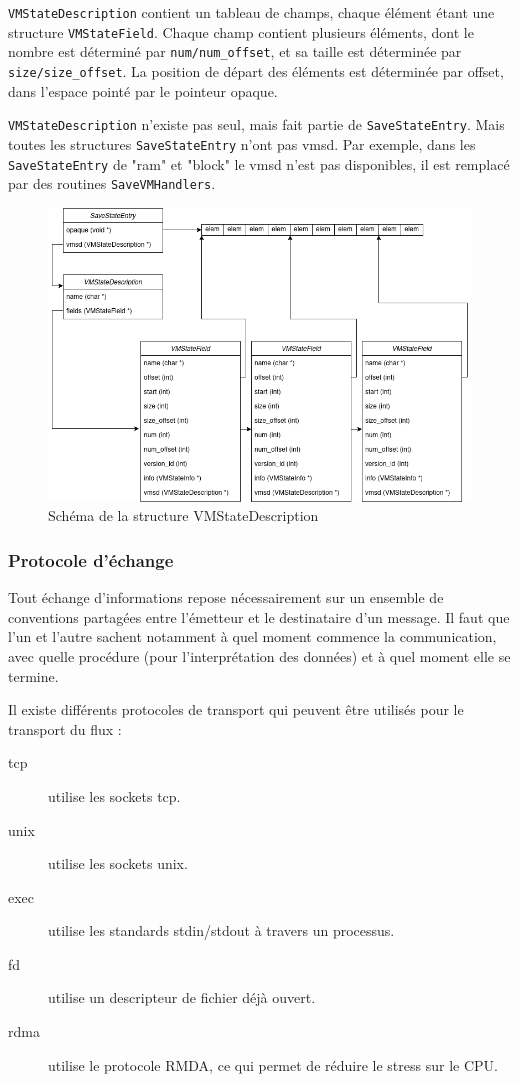 \texttt{VMStateDescription} contient un tableau de champs, chaque élément étant une structure \texttt{VMStateField}.
Chaque champ contient plusieurs éléments, dont le nombre est déterminé par \texttt{num/num\_offset}, et sa taille est déterminée par \texttt{size/size\_offset}.
La position de départ des éléments est déterminée par offset, dans l'espace pointé par le pointeur opaque.

\texttt{VMStateDescription} n'existe pas seul, mais fait partie de \texttt{SaveStateEntry}.
Mais toutes les structures \texttt{SaveStateEntry} n'ont pas vmsd.
Par exemple, dans les \texttt{SaveStateEntry} de "ram" et "block" le vmsd n'est pas disponibles, il est remplacé par des routines \texttt{SaveVMHandlers}. 
\begin{figure}[H]
    \centering
    \includegraphics[width=\textwidth]{include/VMDescription.png}
    \caption{Schéma de la structure VMStateDescription}
\end{figure}



\subsubsection{Protocole d'échange}
Tout échange d’informations repose nécessairement sur un ensemble de conventions partagées entre l'émetteur et le destinataire d'un message.
Il faut que l'un et l'autre sachent notamment à quel moment commence la communication, avec quelle procédure (pour l'interprétation des données) et à quel moment elle se termine.


Il existe différents protocoles de transport qui peuvent être utilisés pour le transport du flux :
\begin{description}
    \item[tcp] utilise les sockets tcp.
    \item[unix] utilise les sockets unix.
    \item[exec] utilise les standards stdin/stdout à travers un processus.
    \item[fd] utilise un descripteur de fichier déjà ouvert.
    \item[rdma] utilise le protocole RMDA, ce qui permet de réduire le stress sur le CPU.
\end{description}

